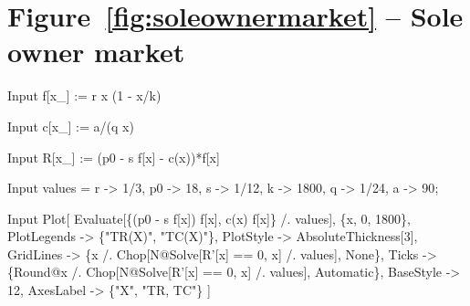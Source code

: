 \documentclass[11pt,fleqn]{book} %
\begin{document}
\section*{Figure~\ref{fig:soleownermarket} -- Sole owner market }
\small{
\begin{mmaCell}[index=1]{Input}
   f[x_] := r x (1 - x/k)
\end{mmaCell}

\begin{mmaCell}{Input}
   c[x_] := a/(q x)
\end{mmaCell}

\begin{mmaCell}{Input}
   R[x_] := (p0 - s f[x] - c(x))*f[x]
\end{mmaCell}

\begin{mmaCell}{Input}
   values = {r -> 1/3, p0 -> 18, s -> 1/12, k -> 1800, q -> 1/24, a -> 90};
\end{mmaCell}

\begin{mmaCell}{Input}
   Plot[
     Evaluate[\{(p0 - s f[x]) f[x], c(x) f[x]\} /. values], 
     \{x, 0, 1800\},
     PlotLegends -> \{"TR(X)", "TC(X)"\}, 
     PlotStyle   -> AbsoluteThickness[3],
     GridLines   -> \{x /. Chop[N@Solve[R'[x] == 0, x] /. values], None\}, 
     Ticks       -> \{Round@x /. Chop[N@Solve[R'[x] == 0, x] /. values], Automatic\}, 
     BaseStyle   -> 12,
     AxesLabel   -> \{"X", "TR, TC"\}
   ]
\end{mmaCell}
}

\end{document}
